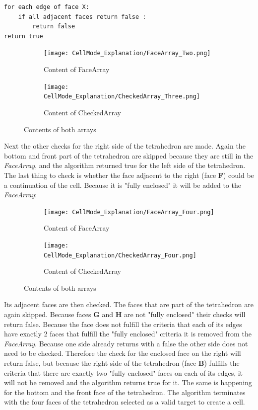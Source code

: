 \documentclass{report}
\begin{document}
		\begin{verbatim}
for each edge of face X:
	if all adjacent faces return false :
		return false
return true
		\end{verbatim}
		\begin{figure}[H]
			\centering
			\begin{subfigure}[H]{2.5in}
				\centering
				\texttt{[image: CellMode\_Explanation/FaceArray\_Two.png]}
				\caption{Content of FaceArray}
				\label{pic:pic5.6.a}
			\end{subfigure}
			\quad
			\begin{subfigure}[H]{2.5in}
				\centering
				\texttt{[image: CellMode\_Explanation/CheckedArray\_Three.png]}
				\caption{Content of CheckedArray}
				\label{pic:pic5.6.b}
			\end{subfigure}
			\caption{Contents of both arrays}
			\label{pic:pic5.6}
		\end{figure}
		\noindent Next the other checks for the right side of the tetrahedron are made. Again the bottom and front part of the tetrahedron are skipped because they are still in the \textit{FaceArray}, and the algorithm returned true for the left side of the tetrahedron. The last thing to check is whether the face adjacent to the right (face \textbf{F}) could be a continuation of the cell. Because it is "fully enclosed" it will be added to the \textit{FaceArray}:
		\begin{figure}[H]
			\centering
			\begin{subfigure}[H]{2.5in}
				\centering
				\texttt{[image: CellMode\_Explanation/FaceArray\_Four.png]}
				\caption{Content of FaceArray}
				\label{pic:pic5.7.a}
			\end{subfigure}
			\quad
			\begin{subfigure}[H]{2.5in}
				\centering
				\texttt{[image: CellMode\_Explanation/CheckedArray\_Four.png]}
				\caption{Content of CheckedArray}
				\label{pic:pic5.7.b}
			\end{subfigure}
			\caption{Contents of both arrays}
			\label{pic:pic5.7}
		\end{figure}
		\noindent Its adjacent faces are then checked. The faces that are part of the tetrahedron are again skipped. Because faces \textbf{G} and \textbf{H} are not "fully enclosed" their checks will return false. Because the face does not fulfill the criteria that each of its edges have exactly 2 faces that fulfill the "fully enclosed" criteria it is removed from the \textit{FaceArray}. Because one side already returns with a false the other side does not need to be checked. Therefore the check for the enclosed face on the right will return false, but because the right side of the tetrahedron (face \textbf{B}) fulfills the criteria that there are exactly two "fully enclosed" faces on each of its edges, it will not be removed and the algorithm returns true for it. The same is happening for the bottom and the front face of the tetrahedron. The algorithm terminates with the four faces of the tetrahedron selected as a valid target to create a cell.
\end{document}
